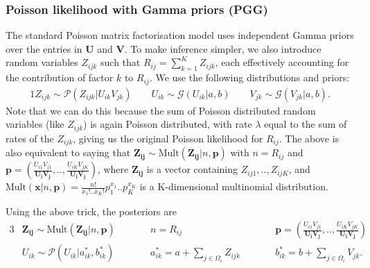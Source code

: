 \documentclass{article}
\newcommand{\U}{\boldsymbol U}
\newcommand{\Ui}{\boldsymbol{U_i}}
\newcommand{\V}{\boldsymbol V}
\newcommand{\Vj}{\boldsymbol{V_j}}
\newcommand{\sumOmegai}{\sum_{j \in \Omega_i}}
\newcommand{\sumk}{\sum_{k=1}^K}
\begin{document}
		\subsubsection{Poisson likelihood with Gamma priors (PGG)}
		The standard Poisson matrix factorisation model uses independent Gamma priors over the entries in $\U$ and $\V$. To make inference simpler, we also introduce random variables $Z_{ijk}$ such that $R_{ij} = \sumk Z_{ijk}$, each effectively accounting for the contribution of factor $k$ to $R_{ij}$. We use the following distributions and priors: 
		\begin{alignat*}{1}
			Z_{ijk} \sim \mathcal{P} (Z_{ijk} | U_{ik} V_{jk} ) 		\quad\quad 			U_{ik} \sim \mathcal{G} ( U_{ik} | a, b )		\quad\quad	V_{jk} \sim \mathcal{G} ( V_{jk} | a, b ).
		\end{alignat*}
		Note that we can do this because the sum of Poisson distributed random variables (like $Z_{ijk}$) is again Poisson distributed, with rate $\lambda $ equal to the sum of rates of the $Z_{ijk}$, giving us the original Poisson likelihood for $R_{ij}$. The above is also equivalent to saying that $\boldsymbol{Z_{ij}} \sim \text{Mult} (\boldsymbol{Z_{ij}} | n, \boldsymbol p) $ with $ n = R_{ij} $ and $ \boldsymbol p = (\frac{U_{i1} V_{j1}}{\Ui \Vj}, .., \frac{U_{iK} V_{jK}}{\Ui \Vj}) $, where $\boldsymbol{Z_{ij}}$ is a vector containing $Z_{ij1}, .., Z_{ijK}$, and $\text{Mult}(\boldsymbol x | n, \boldsymbol p) = \frac{n!}{x_1! .. x_K!} p_1^{x_1} .. p_K^{x_K} $ is a K-dimensional multinomial distribution. 
		
		Using the above trick, the posteriors are
		\begin{alignat*}{3}
			& \boldsymbol{Z_{ij}} \sim \text{Mult} (\boldsymbol{Z_{ij}} | n, \boldsymbol{p} )
			\quad\quad && n = R_{ij}
			\quad\quad && \boldsymbol{p} = (\frac{U_{i1} V_{j1}}{\Ui \Vj}, .., \frac{U_{iK} V_{jK}}{\Ui \Vj}) \\
			& U_{ik} \sim \mathcal{P} (U_{ik} | a^*_{ik}, b^*_{ik} )
			\quad\quad && a^*_{ik} = a + \sumOmegai Z_{ijk}
			\quad\quad &&b^*_{ik} = b + \sumOmegai V_{jk}.
		\end{alignat*}
		
\end{document}
